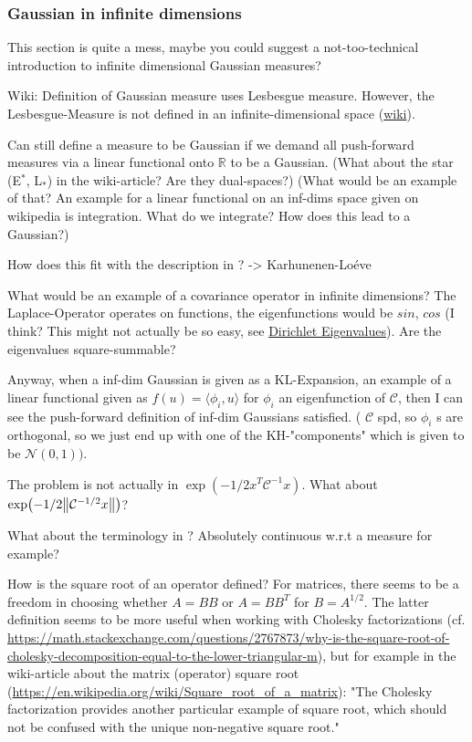 \documentclass[11pt]{article}
\newcommand{\C}{{\mathcal{C}}}
\newcommand{\R}{{\mathbb{R}}}
\newcommand{\N}[2]{\mathcal{N}\left(#1,#2\right)}
\begin{document}
\subsubsection{Gaussian in infinite dimensions}
\label{sec:org1aeaf62}
This section is quite a mess, maybe you could suggest a not-too-technical introduction
to infinite dimensional Gaussian measures?

Wiki: Definition of Gaussian measure uses Lesbesgue measure.
However, the Lesbesgue-Measure is not defined in an infinite-dimensional space (\href{https://en.wikipedia.org/wiki/Infinite-dimensional\_Lebesgue\_measure}{wiki}).

Can still define a measure to be Gaussian if we demand all push-forward measures via a
linear functional onto \(\R\) to be a Gaussian. (What about the star (E\(^{\text{*}}\), L\(_{\text{*}}\))
in the wiki-article? Are they dual-spaces?) (What would be an example of that? An example
for a linear functional on an inf-dims space given on wikipedia is integration.
What do we integrate? How does this lead to a Gaussian?)

How does this fit with the description in \cite{cotter_mcmc_2013}? -> Karhunenen-Loéve

What would be an example of a covariance operator in infinite dimensions?
The Laplace-Operator operates on functions, the eigenfunctions would be \(sin\), \(cos\) (I think?
This might not actually be so easy, see \href{https://en.wikipedia.org/wiki/Dirichlet\_eigenvalue}{Dirichlet Eigenvalues}). Are the eigenvalues
square-summable?

Anyway, when a inf-dim Gaussian is given as a KL-Expansion, an  example of a linear functional
given as \(f(u) = \langle \phi_i, u \rangle\) for \(\phi_i\) an eigenfunction of \(\C\), then I can see
the push-forward definition of inf-dim Gaussians satisfied. ( \(\C\) spd, so \(\phi_i\) s are
orthogonal, so we just end up with one of the KH-"components" which is given to be \(\N{0}{1})\).

The problem is not actually in \(\exp(-1/2x^T\C^{-1}x)\). What about \(\exp(-1/2\norm{\C^{-1/2}x})\)?

What about the terminology in \cite{cotter_mcmc_2013}? Absolutely continuous w.r.t a measure for
example?

How is the square root of an operator defined? For matrices, there seems to be a freedom in
choosing whether \(A = BB\) or \(A = BB^T\) for \(B = A^{1/2}\). The latter definition seems to
be more useful when working with Cholesky factorizations (cf. \url{https://math.stackexchange.com/questions/2767873/why-is-the-square-root-of-cholesky-decomposition-equal-to-the-lower-triangular-m}),
but for example in the wiki-article about the matrix (operator) square root (\url{https://en.wikipedia.org/wiki/Square\_root\_of\_a\_matrix}):
"The Cholesky factorization provides another particular example of square root, which should not be confused with the unique non-negative square root."
\end{document}
